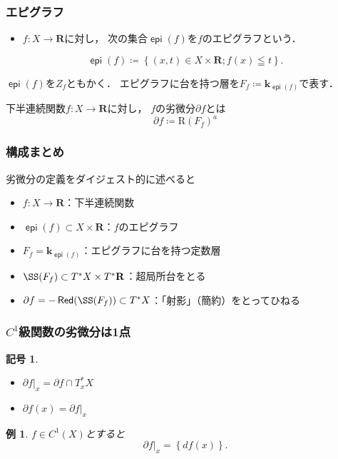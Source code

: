 \documentclass[dvipdfmx,12pt,aspectratio=169,leqno]{beamer}%
\newcommand{\rr}{\mathbf{R}}
\newcommand{\kk}{\mathbf{k}}
\newcommand{\p}{\partial}
\numberwithin{equation}{subsection}
\newcommand{\mres}[2][]{{\left.{#1}\right\rvert}_{#2}}
\newcommand{\Red}{\mathop{\mathsf{Red}}\nolimits}
\newcommand{\epi}{\mathop{\mathsf{epi}}\nolimits}
\theoremstyle{mystyle}
\newtheorem{EG}[AXM]{例}
\newtheorem{NTN}[AXM]{記号}
\begin{document}
\begin{frame}
    \frametitle{エピグラフ}
    
    \begin{definition}
        \begin{itemize}
            \item \(f\colon X\to \rr\)に対し，
            次の集合\(\epi(f)\)を\(f\)のエピグラフという．
        \end{itemize}
        \[
            \epi(f)\coloneqq
            \left\{(x,t)\in X\times \rr;f(x)\leqq t\right\}.
        \]
    \end{definition}
    \(\epi(f)\)を\(Z_f\)ともかく．
    エピグラフに台を持つ層を\(
            F_{f}\coloneqq\kk_{\epi(f)}\)で表す．
    \begin{definition}[ホモロジカル劣微分]
        下半連続関数\(f\colon X\to \rr\)に対し，
        \(f\)の劣微分\(\p f\)とは
        \[\p f\coloneqq \mathrm{R}(F_{f})^{a}\]
    \end{definition}

\end{frame}
\begin{frame}
    \frametitle{構成まとめ}
    劣微分の定義をダイジェスト的に述べると
    \begin{itemize}
        \item \(f\colon X\to \rr\)：下半連続関数
        \item \(\epi(f)\subset X\times \rr\)：\(f\)のエピグラフ
        \item \(F_{f}=\kk_{\epi(f)}\)：エピグラフに台を持つ定数層
        \item \(\SS(F_{f})\subset T^{\ast}X\times T^{\ast}\rr\)：超局所台をとる
        \item \(\p f = -\Red(\SS(F_{f}))\subset T^{\ast}X\)：「射影」（簡約）をとってひねる
    \end{itemize}
\end{frame}

\begin{frame}
    \frametitle{\(C^1\)級関数の劣微分は1点}
    \begin{NTN}
        \begin{itemize}
            \item \(\mres[\partial f]{x}=\partial f\cap T^{\ast}_{x}X\)
            \item \(\partial f(x)=\mres[\partial f]{x}\)
        \end{itemize}
    \end{NTN}
    \begin{EG}
        \(f\in C^{1}(X)\)とすると\[
            \mres[\partial f]{x}=\left\{df(x)\right\}.
        \]
    \end{EG}
\end{frame}
\end{document}
